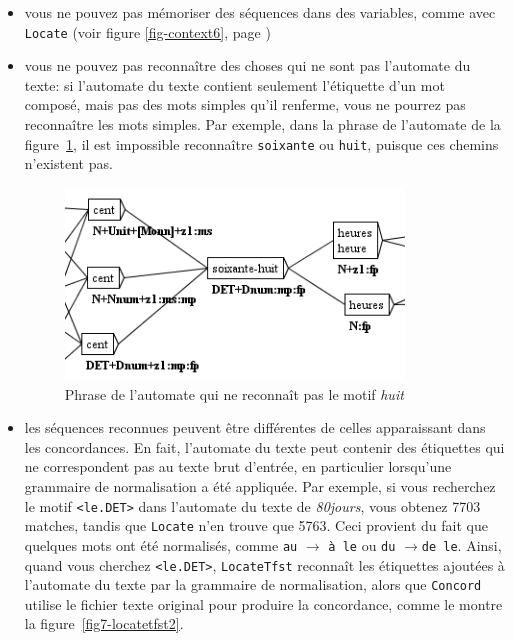 \begin{itemize}
    \item vous ne pouvez pas mémoriser des séquences dans des variables, comme avec \verb+Locate+
    	    (voir figure \ref{fig-context6}, page \pageref{fig-context6})
    \item vous ne pouvez pas reconnaître des choses qui ne sont pas l'automate du texte:
    si l'automate du texte contient seulement l'étiquette d'un mot composé, mais pas des
    mots simples qu'il renferme, vous ne pourrez pas reconnaître les mots simples.
    Par exemple, dans la phrase de l'automate de la figure~\ref{fig7-locatetfst1},
    il est impossible reconnaître \verb+soixante+ ou \verb+huit+, puisque ces chemins n'existent pas.
    
\begin{figure}[!ht]
\begin{center}
\includegraphics[width=9cm]{resources/img/fig7-locatetfst1.png}
\caption{Phrase de l'automate qui ne reconnaît pas le motif
\textit{huit}\label{fig7-locatetfst1}}
\end{center}
\end{figure}

\item les séquences reconnues peuvent être différentes de celles apparaissant dans les concordances.
	En fait, l'automate du texte peut contenir des étiquettes qui ne correspondent pas au texte
	brut d'entrée, en particulier lorsqu'une grammaire de normalisation a été appliquée.
	Par exemple, si vous recherchez le motif \verb+<le.DET>+ dans l'automate du texte de
	\textit{80jours}, vous obtenez 7703 matches, tandis que \verb+Locate+ n'en trouve que 5763.
	Ceci provient du fait que quelques mots ont été normalisés, comme \verb+au+
	$\rightarrow$ \verb+à le+ ou \verb+du+ $\rightarrow$\verb+de le+.
	Ainsi, quand vous cherchez \verb+<le.DET>+, \verb+LocateTfst+
	reconnaît les étiquettes ajoutées à l'automate du texte par la grammaire de normalisation,
	alors que \verb+Concord+ utilise le fichier texte original pour produire la concordance,
	comme le montre la figure~\ref{fig7-locatetfst2}.


\end{itemize}
